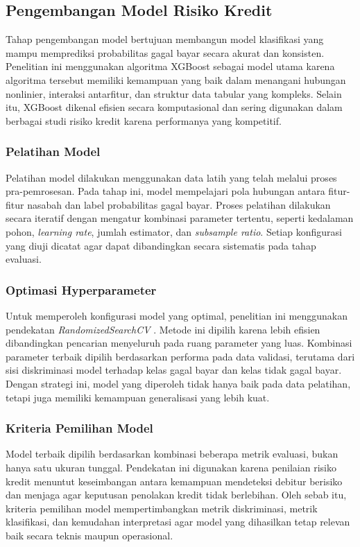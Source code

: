 \subsection{Pengembangan Model Risiko Kredit}
Tahap pengembangan model bertujuan membangun model klasifikasi yang mampu memprediksi probabilitas gagal bayar secara akurat dan konsisten. Penelitian ini menggunakan algoritma XGBoost sebagai model utama karena algoritma tersebut memiliki kemampuan yang baik dalam menangani hubungan nonlinier, interaksi antarfitur, dan struktur data tabular yang kompleks. Selain itu, XGBoost dikenal efisien secara komputasional dan sering digunakan dalam berbagai studi risiko kredit karena performanya yang kompetitif.

\subsubsection{Pelatihan Model}
Pelatihan model dilakukan menggunakan data latih yang telah melalui proses pra-pemrosesan. Pada tahap ini, model mempelajari pola hubungan antara fitur-fitur nasabah dan label probabilitas gagal bayar. Proses pelatihan dilakukan secara iteratif dengan mengatur kombinasi parameter tertentu, seperti kedalaman pohon, \textit{learning rate}, jumlah estimator, dan \textit{subsample ratio}. Setiap konfigurasi yang diuji dicatat agar dapat dibandingkan secara sistematis pada tahap evaluasi.

\subsubsection{Optimasi Hyperparameter}
Untuk memperoleh konfigurasi model yang optimal, penelitian ini menggunakan pendekatan \textit{RandomizedSearchCV} \cite{yotsawat2021improved}. Metode ini dipilih karena lebih efisien dibandingkan pencarian menyeluruh pada ruang parameter yang luas. Kombinasi parameter terbaik dipilih berdasarkan performa pada data validasi, terutama dari sisi diskriminasi model terhadap kelas gagal bayar dan kelas tidak gagal bayar. Dengan strategi ini, model yang diperoleh tidak hanya baik pada data pelatihan, tetapi juga memiliki kemampuan generalisasi yang lebih kuat.

\subsubsection{Kriteria Pemilihan Model}
Model terbaik dipilih berdasarkan kombinasi beberapa metrik evaluasi, bukan hanya satu ukuran tunggal. Pendekatan ini digunakan karena penilaian risiko kredit menuntut keseimbangan antara kemampuan mendeteksi debitur berisiko dan menjaga agar keputusan penolakan kredit tidak berlebihan. Oleh sebab itu, kriteria pemilihan model mempertimbangkan metrik diskriminasi, metrik klasifikasi, dan kemudahan interpretasi agar model yang dihasilkan tetap relevan baik secara teknis maupun operasional.

